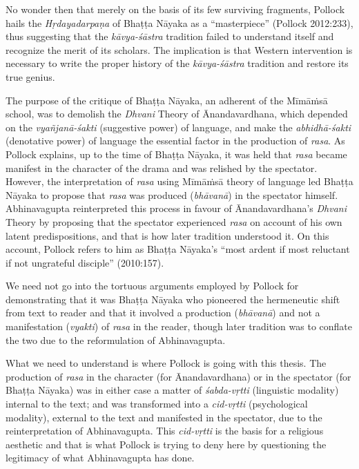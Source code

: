 No wonder then that merely on the basis of its few surviving fragments, Pollock hails the \textsl{Hṛdayadarpaṇa} of Bhaṭṭa Nāyaka as a ``masterpiece'' (Pollock 2012:233), thus suggesting that the \textsl{kāvya-śāstra} tradition failed to understand itself and recognize the merit of its scholars. The implication is that Western intervention is necessary to write the proper history of the \textsl{kāvya-śāstra} tradition and restore its true genius.

The purpose of the critique of Bhaṭṭa Nāyaka, an adherent of the Mīmāṁsā school, was to demolish the \textsl{Dhvani} Theory of Ānandavardhana, which depended on the \textsl{vyañjanā-śakti} (suggestive power) of language, and make the \textsl{abhidhā-śakti} (denotative power) of language the essential factor in the production of \textsl{rasa}. As Pollock explains, up to the time of Bhaṭṭa Nāyaka, it was held that \textsl{rasa} became manifest in the character of the drama and was relished by the spectator. However, the interpretation of \textsl{rasa} using Mīmāṁsā theory of language led Bhaṭṭa Nāyaka to propose that \textsl{rasa} was produced (\textsl{bhāvanā}) in the spectator himself. Abhinavagupta reinterpreted this process in favour of Ānandavardhana's
 \textsl{Dhvani} Theory by proposing that the spectator experienced \textsl{rasa} on account of his own latent predispositions, and that is how later tradition understood it. On this account, Pollock refers to him as Bhaṭṭa Nāyaka's ``most ardent if most reluctant if not ungrateful disciple'' (2010:157). 
 
We need not go into the tortuous arguments employed by Pollock for demonstrating that it was Bhaṭṭa Nāyaka who pioneered the hermeneutic shift from text to reader and that it involved a production (\textsl{bhāvanā}) and not a manifestation (\textsl{vyakti}) of \textsl{rasa} in the reader, though later tradition was to conflate the two due to the reformulation of Abhinavagupta. 
 
What we need to understand is where Pollock is going with this thesis. The production of \textsl{rasa} in the character (for Ānandavardhana) or in the spectator (for Bhaṭṭa Nāyaka) was in either case a matter of \textsl{śabda-vṛtti} (linguistic modality) internal to the text; and was transformed into a \textsl{cid-vṛtti} (psychological modality), external to the text and manifested in the spectator, due to the reinterpretation of Abhinavagupta. This \textsl{cid-vṛtti} is the basis for a religious aesthetic and that is what Pollock is trying to deny here by questioning the legitimacy of what Abhinavagupta has done. 
 
